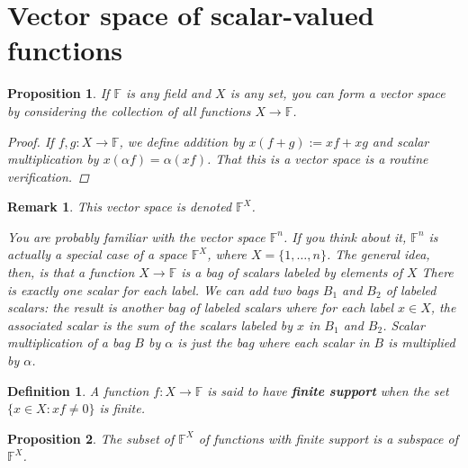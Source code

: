 \documentclass[a4paper,14pt]{article}
\newtheorem*{prop}{Proposition}
\newtheorem*{remark}{Remark}
\newtheorem*{defn}{Definition}
\begin{document}
\section{Vector space of scalar-valued functions}
\begin{prop}
If $\mathbb{F}$ is any field and $X$ is any set, you can form a vector space by considering the collection of all functions $X \to \mathbb{F}$. 

\begin{proof}
If $f, g: X \to \mathbb{F}$, we define addition by $x(f + g) := xf + xg$ and scalar multiplication by $x(\alpha f) = \alpha (x f)$. That this is a vector space is a routine verification.
\end{proof}
\end{prop}

\begin{remark}
This vector space is denoted $\mathbb{F}^X$.

You are probably familiar with the vector space $\mathbb{F}^n$. If you think about it, $\mathbb{F}^n$ is actually a special case of a space $\mathbb{F}^X$, where $X = \{1, \ldots, n\}$. The general idea, then, is that a function $X \to \mathbb{F}$ is a bag of scalars labeled by elements of $X$ There is exactly one scalar for each label. We can add two bags $B_1$ and $B_2$ of labeled scalars: the result is another bag of labeled scalars where for each label $x \in X$, the associated scalar is the sum of the scalars labeled by $x$ in $B_1$ and $B_2$. Scalar multiplication of a bag $B$ by $\alpha$ is just the bag where each scalar in $B$ is multiplied by $\alpha$.
\end{remark}

\begin{defn}
A function $f: X \to \mathbb{F}$ is said to have \textbf{finite support} when the set $\{x \in X : xf \neq 0\}$ is finite.
\end{defn}

\begin{prop}
The subset of $\mathbb{F}^X$ of functions with finite support is a subspace of $\mathbb{F}^X$.
\end{prop}
\end{document}
